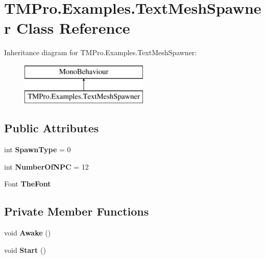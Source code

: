 \hypertarget{class_t_m_pro_1_1_examples_1_1_text_mesh_spawner}{}\section{T\+M\+Pro.\+Examples.\+Text\+Mesh\+Spawner Class Reference}
\label{class_t_m_pro_1_1_examples_1_1_text_mesh_spawner}
Inheritance diagram for T\+M\+Pro.\+Examples.\+Text\+Mesh\+Spawner\+:\begin{figure}[H]
\begin{center}
\leavevmode
\includegraphics[height=2.000000cm]{class_t_m_pro_1_1_examples_1_1_text_mesh_spawner}
\end{center}
\end{figure}
\subsection*{Public Attributes}
\begin{DoxyCompactItemize}
\item 
\mbox{\label{class_t_m_pro_1_1_examples_1_1_text_mesh_spawner_ab194341830ee5e784c176b8b516d6fe3}} 
int {\bfseries Spawn\+Type} = 0
\item 
\mbox{\label{class_t_m_pro_1_1_examples_1_1_text_mesh_spawner_a27f2e4feca0ce34a67de071e9e256bfb}} 
int {\bfseries Number\+Of\+N\+PC} = 12
\item 
\mbox{\label{class_t_m_pro_1_1_examples_1_1_text_mesh_spawner_a5095e4cdcd5de19421b45082723ea30e}} 
Font {\bfseries The\+Font}
\end{DoxyCompactItemize}
\subsection*{Private Member Functions}
\begin{DoxyCompactItemize}
\item 
\mbox{\label{class_t_m_pro_1_1_examples_1_1_text_mesh_spawner_a8c83bc49fd88b2cca7c317fe13a122f2}} 
void {\bfseries Awake} ()
\item 
\mbox{\label{class_t_m_pro_1_1_examples_1_1_text_mesh_spawner_a785c4650a74655c3511de4b05a82a421}} 
void {\bfseries Start} ()
\end{DoxyCompactItemize}
